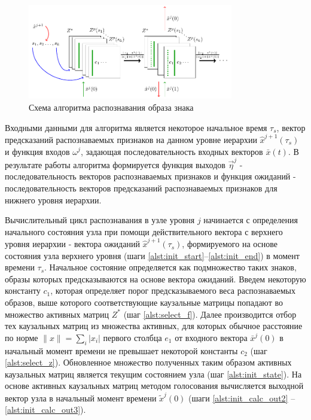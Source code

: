 \documentclass[12pt]{scrartcl}
\begin{document}
	\begin{figure}
		\centering
		\includegraphics[width=0.8\textwidth]{algo/perception}
		\caption{Схема алгоритма распознавания образа знака}
		\label{fig:percept}		
	\end{figure}

	\linespread{1}
	\begin{algorithm}[H]
		\label{alg:automato}
		\begin{algorithmic}[1]
			
		\end{algorithmic}
	\end{algorithm}
	\linespread{2}

	Входными данными для алгоритма является некоторое начальное время $\tau_s$, вектор предсказаний распознаваемых признаков на данном уровне иерархии $\hat x^{j+1}(\tau_s)$ и функция входов $\omega^j$, задающая последовательность входных векторов $\bar x(t)$. В результате работы алгоритма формируется функция выходов $\vec \eta^j$ - последовательность векторов распознаваемых признаков и функция ожиданий - последовательность векторов предсказаний распознаваемых признаков для нижнего уровня иерархии.
	
	Вычислительный цикл распознавания в узле уровня $j$ начинается с определения начального состояния узла при помощи действительного вектора с верхнего уровня иерархии - вектора ожиданий $\hat x^{j+1}(\tau_s)$, формируемого на основе состояния узла верхнего уровня (шаги \ref{alst:init_start}--\ref{alst:init_end}) в момент времени $\tau_s$. Начальное состояние определяется как подмножество таких знаков, образы которых предсказываются на основе вектора ожиданий. Введем некоторую константу $c_1$, которая определяет порог предсказываемого веса распознаваемых образов, выше которого соответствующие каузальные матрицы попадают во множество активных матриц $Z^*$ (шаг \ref{alst:select_f}). Далее производится отбор тех каузальных матриц из множества активных, для которых обычное расстояние по норме $\|x\|=\sum_i |x_i|$ первого столбца $e_1$ от входного вектора $\bar x^j(0)$ в начальный момент времени не превышает некоторой константы $c_2$ (шаг \ref{alst:select_z}). Обновленное множество полученных таким образом активных каузальных матриц является текущим состоянием узла (шаг \ref{alst:init_state}). На основе активных каузальных матриц методом голосования вычисляется выходной вектор узла  в начальный момент времени $\tilde x^j(0)$ (шаги \ref{alst:init_calc_out2} -- \ref{alst:init_calc_out3}).
\end{document}
